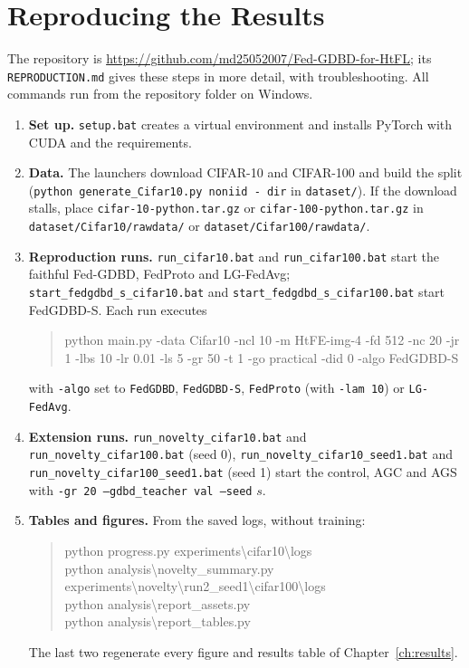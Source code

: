 \chapter{Reproducing the Results}
\label{app:repro}

The repository is \url{https://github.com/md25052007/Fed-GDBD-for-HtFL}; its \texttt{REPRODUCTION.md} gives these steps in more detail, with troubleshooting. All commands run from the repository folder on Windows.

\begin{enumerate}
\item \textbf{Set up.} \texttt{setup.bat} creates a virtual environment and installs PyTorch with CUDA and the requirements.
\item \textbf{Data.} The launchers download CIFAR-10 and CIFAR-100 and build the split (\texttt{python generate\_Cifar10.py noniid - dir} in \texttt{dataset/}). If the download stalls, place \texttt{cifar-10-python.tar.gz} or \texttt{cifar-100-python.tar.gz} in \texttt{dataset/Cifar10/rawdata/} or \texttt{dataset/Cifar100/rawdata/}.
\item \textbf{Reproduction runs.} \texttt{run\_cifar10.bat} and \texttt{run\_cifar100.bat} start the faithful Fed-GDBD, FedProto and LG-FedAvg; \texttt{start\_fedgdbd\_s\_cifar10.bat} and \texttt{start\_fedgdbd\_s\_cifar100.bat} start FedGDBD-S. Each run executes
\begin{quote}\small\ttfamily
python main.py -data Cifar10 -ncl 10 -m HtFE-img-4 -fd 512 -nc 20 -jr 1 -lbs 10 -lr 0.01 -ls 5 -gr 50 -t 1 -go practical -did 0 -algo FedGDBD-S
\end{quote}
with \texttt{-algo} set to \texttt{FedGDBD}, \texttt{FedGDBD-S}, \texttt{FedProto} (with \texttt{-lam 10}) or \texttt{LG-FedAvg}.
\item \textbf{Extension runs.} \texttt{run\_novelty\_cifar10.bat} and \texttt{run\_novelty\_cifar100.bat} (seed 0), \texttt{run\_novelty\_cifar10\_seed1.bat} and \texttt{run\_novelty\_cifar100\_seed1.bat} (seed 1) start the control, AGC and AGS with \texttt{-gr 20 --gdbd\_teacher val --seed} $s$.
\item \textbf{Tables and figures.} From the saved logs, without training:
\begin{quote}\small\ttfamily
python progress.py experiments\textbackslash cifar10\textbackslash logs\\
python analysis\textbackslash novelty\_summary.py experiments\textbackslash novelty\textbackslash run2\_seed1\textbackslash cifar100\textbackslash logs\\
python analysis\textbackslash report\_assets.py\\
python analysis\textbackslash report\_tables.py
\end{quote}
The last two regenerate every figure and results table of Chapter~\ref{ch:results}.
\end{enumerate}

